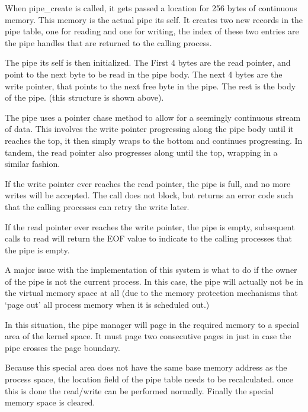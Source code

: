 \documentclass[a4paper]{report}
\begin{document}
When pipe\_create is called, it gets passed a location for 256 bytes of continuous memory. This memory is the actual pipe its self. It creates two new records in the pipe table, one for reading and one for writing, the index of these two entries are the pipe handles that are returned to the calling process.

The pipe its self is then initialized. The First 4 bytes are the read pointer, and point to the next byte to be read in the pipe body. The next 4 bytes are the write pointer, that points to the next free byte in the pipe. The rest is the body of the pipe. (this structure is shown above).

The pipe uses a pointer chase method to allow for a seemingly continuous stream of data. This involves the write pointer progressing along the pipe body until it reaches the top, it then simply wraps to the bottom and continues progressing. In tandem, the read pointer also progresses along until the top, wrapping in a similar fashion.

If the write pointer ever reaches the read pointer, the pipe is full, and no more writes will be accepted. The call does not block, but returns an error code such that the calling processes can retry the write later.

If the read pointer ever reaches the write pointer, the pipe is empty, subsequent calls to read will return the EOF value to indicate to the calling processes that the pipe is empty.

A major issue with the implementation of this system is what to do if the owner of the pipe is not the current process. In this case, the pipe will actually not be in the virtual memory space at all (due to the memory protection mechanisms that `page out' all process memory when it is scheduled out.)

In this situation, the pipe manager will page in the required memory to a special area of the kernel space. It must page two consecutive pages in just in case the pipe crosses the page boundary.

Because this special area does not have the same base memory address as the process space, the location field of the pipe table needs to be recalculated. once this is done the read/write can be performed normally. Finally the special memory space is cleared.










\clearpage
\end{document}
